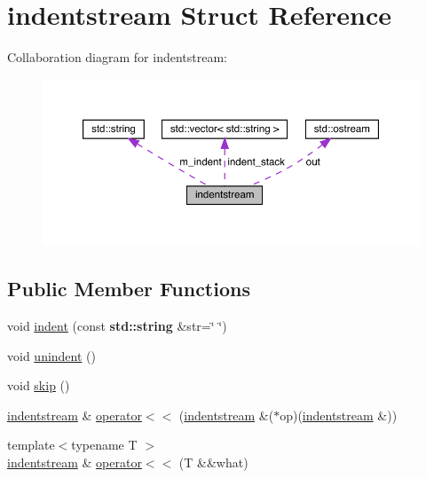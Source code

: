 \hypertarget{structindentstream}{}\section{indentstream Struct Reference}
\label{structindentstream}


Collaboration diagram for indentstream\+:
\nopagebreak
\begin{figure}[H]
\begin{center}
\leavevmode
\includegraphics[width=350pt]{structindentstream__coll__graph}
\end{center}
\end{figure}
\subsection*{Public Member Functions}
\begin{DoxyCompactItemize}
\item 
void \hyperlink{structindentstream_a66e1cdf88e9c1de42135a386733e3220}{indent} (const \textbf{ std\+::string} \&str=\char`\"{}  \char`\"{})
\item 
void \hyperlink{structindentstream_a3721933459c8e2ed2cac1de036d6f24d}{unindent} ()
\item 
void \hyperlink{structindentstream_ada2944223b784a82ed3b52d775155088}{skip} ()
\item 
\hyperlink{structindentstream}{indentstream} \& \hyperlink{structindentstream_ab683899164b308cc57ed5c9d37c8f012}{operator$<$$<$} (\hyperlink{structindentstream}{indentstream} \&($\ast$op)(\hyperlink{structindentstream}{indentstream} \&))
\item 
{\footnotesize template$<$typename T $>$ }\\\hyperlink{structindentstream}{indentstream} \& \hyperlink{structindentstream_a721a69a93672a46ea80ef2bb83c59201}{operator$<$$<$} (T \&\&what)
\end{DoxyCompactItemize}
